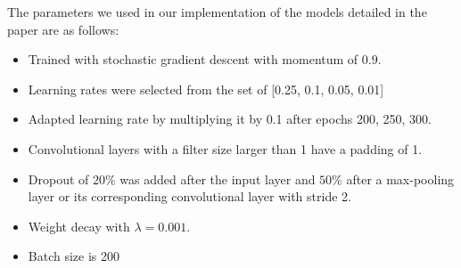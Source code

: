 The parameters we used in our implementation of the models detailed in the paper are as follows:
\begin{itemize}
\item Trained with stochastic gradient descent with momentum of $0.9$.
\item Learning rates were selected from the set of [0.25, 0.1, 0.05, 0.01]
\item Adapted learning rate by multiplying it by 0.1 after epochs 200, 250, 300.
\item Convolutional layers with a filter size larger than 1 have a padding of 1.
\item Dropout of $20\%$ was added after the input layer and $50\%$ after a max-pooling layer or its corresponding convolutional layer with stride 2.
\item Weight decay with $\lambda = 0.001$.
\item Batch size is 200
\end{itemize}